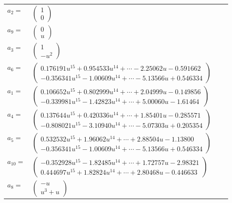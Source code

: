 \documentclass[1p]{elsarticle_modified}
\theoremstyle{definition}
\begin{document}
\begin{tabular}{m{7pt} m{180pt} m{7pt} m{180pt} }
\flushright $a_{2}=$&$\begin{pmatrix}1\\0\end{pmatrix}$ \\
\flushright $a_{9}=$&$\begin{pmatrix}0\\u\end{pmatrix}$ \\
\flushright $a_{3}=$&$\begin{pmatrix}1\\- u^2\end{pmatrix}$ \\
\flushright $a_{6}=$&$\begin{pmatrix}0.176191 u^{15}+0.954533 u^{14}+\cdots-2.25062 u-0.591662\\-0.356341 u^{15}-1.00609 u^{14}+\cdots-5.13566 u+0.546334\end{pmatrix}$ \\
\flushright $a_{1}=$&$\begin{pmatrix}0.106652 u^{15}+0.802999 u^{14}+\cdots+2.04999 u-0.149856\\-0.339981 u^{15}-1.42823 u^{14}+\cdots+5.00060 u-1.61464\end{pmatrix}$ \\
\flushright $a_{4}=$&$\begin{pmatrix}0.137644 u^{15}+0.420336 u^{14}+\cdots+1.85401 u-0.285571\\-0.808021 u^{15}-3.10940 u^{14}+\cdots-5.07303 u+0.205354\end{pmatrix}$ \\
\flushright $a_{5}=$&$\begin{pmatrix}0.532532 u^{15}+1.96062 u^{14}+\cdots+2.88504 u-1.13800\\-0.356341 u^{15}-1.00609 u^{14}+\cdots-5.13566 u+0.546334\end{pmatrix}$ \\
\flushright $a_{10}=$&$\begin{pmatrix}-0.352928 u^{15}-1.82485 u^{14}+\cdots+1.72757 u-2.98321\\0.444697 u^{15}+1.82824 u^{14}+\cdots+2.80468 u-0.446633\end{pmatrix}$ \\
\flushright $a_{8}=$&$\begin{pmatrix}- u\\u^3+u\end{pmatrix}$ \\

\end{tabular}
\end{document}
